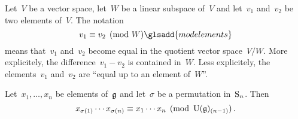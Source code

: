 

\begin{recall}
	Let~$V$ be a vector space, let~$W$ be a linear subspace of~$V$ and let~$v_1$ and~$v_2$ be two elements of~$V$.
	The notation
	\[
		v_1 \equiv v_2
		\pmod{W}
		\glsadd{mod elements}
	\]
	means that~$v_1$ and~$v_2$ become equal in the quotient vector space~$V/W$.
	More explicitely, the difference~$v_1 - v_2$ is contained in~$W$.
	Less explicitely, the elements~$v_1$ and~$v_2$ are \enquote{equal up to an element of~$W$}.
\end{recall}


\begin{lemma}
	\label{rearranging lemma}
	Let~$x_1, \dotsc, x_n$ be elements of~$\mathfrak{g}$ and let~$\sigma$ be a permutation in~$\operatorname{S}_n$.
	Then
	\[
		x_{\sigma(1)} \dotsm x_{\sigma(n)}
		\equiv
		x_1 \dotsm x_n
		\pmod{ \operatorname{U}(\mathfrak{g})_{(n-1)} } \,.
	\]
\end{lemma}



